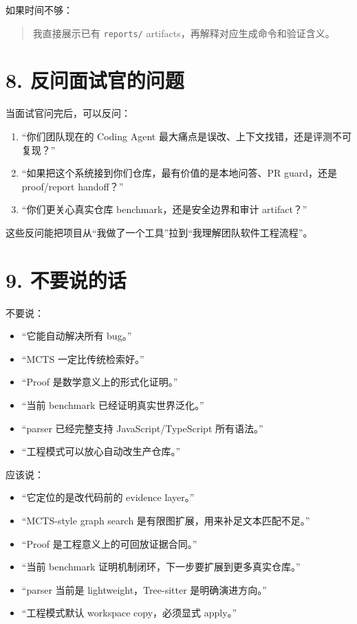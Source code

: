 \documentclass[UTF8,12pt,openany]{ctexbook}
\begin{document}
如果时间不够：\par

\begin{quote}
我直接展示已有 \texttt{reports/} artifacts，再解释对应生成命令和验证含义。
\end{quote}

\section{8. 反问面试官的问题}

当面试官问完后，可以反问：\par

\begin{enumerate}
\item “你们团队现在的 Coding Agent 最大痛点是误改、上下文找错，还是评测不可复现？”
\item “如果把这个系统接到你们仓库，最有价值的是本地问答、PR guard，还是 proof/report handoff？”
\item “你们更关心真实仓库 benchmark，还是安全边界和审计 artifact？”
\end{enumerate}

这些反问能把项目从“我做了一个工具”拉到“我理解团队软件工程流程”。\par

\section{9. 不要说的话}

不要说：\par

\begin{itemize}
\item “它能自动解决所有 bug。”
\item “MCTS 一定比传统检索好。”
\item “Proof 是数学意义上的形式化证明。”
\item “当前 benchmark 已经证明真实世界泛化。”
\item “parser 已经完整支持 JavaScript/TypeScript 所有语法。”
\item “工程模式可以放心自动改生产仓库。”
\end{itemize}

应该说：\par

\begin{itemize}
\item “它定位的是改代码前的 evidence layer。”
\item “MCTS-style graph search 是有限图扩展，用来补足文本匹配不足。”
\item “Proof 是工程意义上的可回放证据合同。”
\item “当前 benchmark 证明机制闭环，下一步要扩展到更多真实仓库。”
\item “parser 当前是 lightweight，Tree-sitter 是明确演进方向。”
\item “工程模式默认 workspace copy，必须显式 apply。”
\end{itemize}
\end{document}
